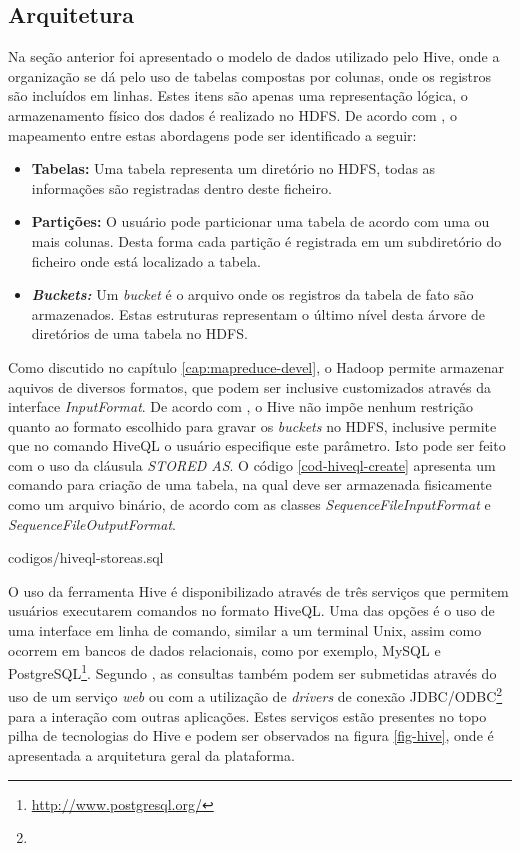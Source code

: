 \subsection{Arquitetura}

Na seção anterior foi apresentado o modelo de dados utilizado pelo Hive, onde a organização se dá pelo uso de tabelas compostas por colunas, onde os registros são incluídos em linhas. Estes itens são apenas uma representação lógica, o armazenamento físico dos dados é realizado no HDFS. De acordo com , o mapeamento entre estas abordagens pode ser identificado a seguir:

\begin{itemize}

  \item \textbf{Tabelas:} Uma tabela representa um diretório no HDFS, todas as informações são registradas dentro deste ficheiro.
  \item \textbf{Partições:} O usuário pode particionar uma tabela de acordo com uma ou mais colunas. Desta forma cada partição é registrada em um subdiretório do ficheiro onde está localizado a tabela.
  \item \textit{\textbf{Buckets:}} Um \textit{bucket} é o arquivo onde os registros da tabela de fato são armazenados. Estas estruturas representam o último nível desta árvore de diretórios de uma tabela no HDFS.

\end{itemize}

Como discutido no capítulo \ref{cap:mapreduce-devel}, o Hadoop permite armazenar aquivos de diversos formatos, que podem ser inclusive customizados através da interface \textit{InputFormat}. De acordo com , o Hive não impõe nenhum restrição quanto ao formato escolhido para gravar os \textit{buckets} no HDFS, inclusive permite que no comando HiveQL o usuário especifique este parâmetro. Isto pode ser feito com o uso da cláusula \textit{STORED AS}. O código \ref{cod-hiveql-create} apresenta um comando para criação de uma tabela, na qual deve ser armazenada fisicamente como um arquivo binário, de acordo com as classes \textit{SequenceFileInputFormat} e \textit{SequenceFileOutputFormat}.



		{codigos/hiveql-storeas.sql}
\FloatBarrier

O uso da ferramenta Hive é disponibilizado através de três serviços que permitem usuários executarem comandos no formato HiveQL. Uma das opções é o uso de uma interface em linha de comando, similar a um terminal Unix, assim como ocorrem em bancos de dados relacionais, como por exemplo, MySQL e PostgreSQL\footnote{\url{http://www.postgresql.org/}}. Segundo , as consultas também podem ser submetidas através do uso de um serviço \textit{web} ou com a utilização de \textit{drivers} de conexão JDBC/ODBC\footnote{} para a interação com outras aplicações. Estes serviços estão presentes no topo pilha de tecnologias do Hive e podem ser observados na figura \ref{fig-hive}, onde é apresentada a arquitetura geral da plataforma.


